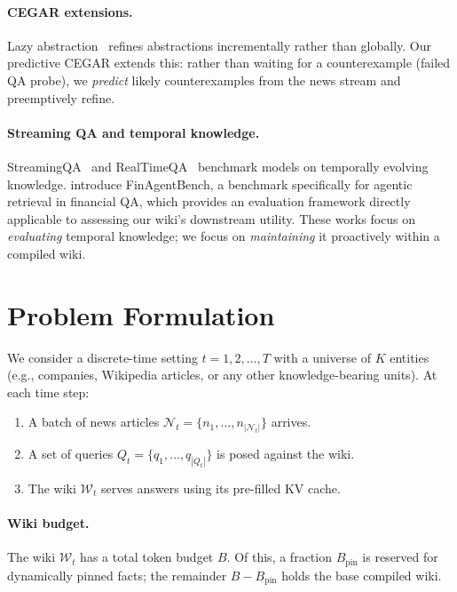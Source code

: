 \documentclass{article}
\newcommand{\wt}{\mathcal{W}_t}
\newcommand{\nt}{\mathcal{N}_t}
\begin{document}
\paragraph{CEGAR extensions.}
Lazy abstraction~\citep{henzinger2002lazy, mcmillan2006lazy} refines abstractions incrementally rather than globally.
Our predictive CEGAR extends this: rather than waiting for a counterexample (failed QA probe), we \emph{predict} likely counterexamples from the news stream and preemptively refine.

\paragraph{Streaming QA and temporal knowledge.}
StreamingQA~\citep{liska2022streamingqa} and RealTimeQA~\citep{kasai2024realtime} benchmark models on temporally evolving knowledge.
\citet{choi2025finagentbench} introduce FinAgentBench, a benchmark specifically for agentic retrieval in financial QA, which provides an evaluation framework directly applicable to assessing our wiki's downstream utility.
These works focus on \emph{evaluating} temporal knowledge; we focus on \emph{maintaining} it proactively within a compiled wiki.

\section{Problem Formulation}
\label{sec:problem}

We consider a discrete-time setting $t = 1, 2, \ldots, T$ with a universe of $K$ entities (e.g., companies, Wikipedia articles, or any other knowledge-bearing units).
At each time step:

\begin{enumerate}
  \item A batch of news articles $\nt = \{n_1, \ldots, n_{|\nt|}\}$ arrives.
  \item A set of queries $Q_t = \{q_1, \ldots, q_{|Q_t|}\}$ is posed against the wiki.
  \item The wiki $\wt$ serves answers using its pre-filled KV cache.
\end{enumerate}

\paragraph{Wiki budget.}
The wiki $\wt$ has a total token budget $B$.
Of this, a fraction $B_{\text{pin}}$ is reserved for dynamically pinned facts; the remainder $B - B_{\text{pin}}$ holds the base compiled wiki.
\end{document}
